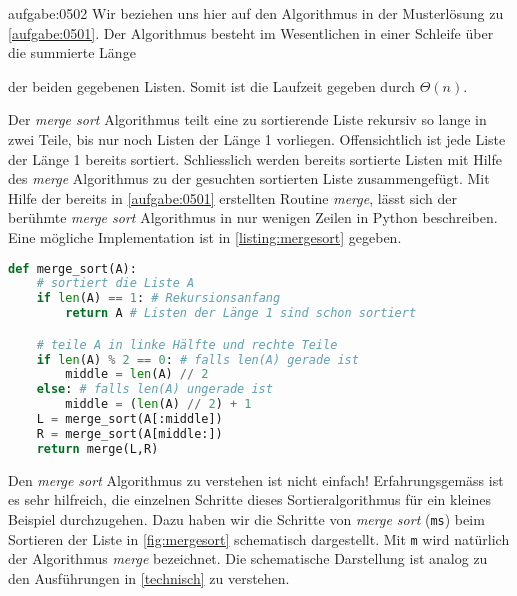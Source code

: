 \begin{antwort}{aufgabe:0502}
Wir beziehen uns hier auf den Algorithmus in der Musterlösung zu \cref{aufgabe:0501}. Der Algorithmus besteht im Wesentlichen in einer Schleife über die summierte Länge
\begin{center}
\end{center}
der beiden gegebenen Listen. Somit ist die Laufzeit gegeben durch $\Theta(n)$.
\end{antwort}

\noindent
Der \textit{merge sort} Algorithmus teilt eine zu sortierende Liste rekursiv so lange in zwei Teile, bis nur noch Listen der Länge 1 vorliegen. Offensichtlich ist jede Liste der Länge 1 bereits sortiert. Schliesslich werden bereits sortierte Listen mit Hilfe des \textit{merge} Algorithmus zu der gesuchten sortierten Liste zusammengefügt. Mit Hilfe der bereits in \cref{aufgabe:0501} erstellten Routine \textit{merge}, lässt sich der berühmte \textit{merge sort} Algorithmus in nur wenigen Zeilen in Python beschreiben. Eine mögliche Implementation ist in \cref{listing:mergesort} gegeben.
\begin{lstlisting}[language=Python,caption=Implementation der Funktion \pythoninline{merge_sort}.,label=listing:mergesort]
def merge_sort(A):
    # sortiert die Liste A
    if len(A) == 1: # Rekursionsanfang
        return A # Listen der Länge 1 sind schon sortiert

    # teile A in linke Hälfte und rechte Teile
    if len(A) % 2 == 0: # falls len(A) gerade ist
        middle = len(A) // 2
    else: # falls len(A) ungerade ist
        middle = (len(A) // 2) + 1
    L = merge_sort(A[:middle])
    R = merge_sort(A[middle:])
    return merge(L,R)
\end{lstlisting} 
Den \textit{merge sort} Algorithmus zu verstehen ist nicht einfach! Erfahrungsgemäss ist es sehr hilfreich, die einzelnen Schritte dieses Sortieralgorithmus für ein kleines Beispiel durchzugehen. Dazu haben wir die Schritte von \textit{merge sort} (\verb|ms|) beim Sortieren der Liste \pythoninline{[3,2,1]} in \cref{fig:mergesort} schematisch dargestellt. Mit \verb|m| wird natürlich der Algorithmus \textit{merge} bezeichnet. Die schematische Darstellung ist analog zu den Ausführungen in \cref{technisch} zu verstehen.
